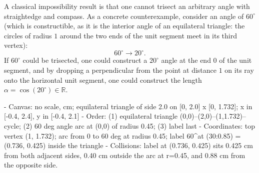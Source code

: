\begin{content}
A classical impossibility result is that one cannot trisect an arbitrary angle with straightedge and compass. As a concrete counterexample, consider an angle of $60^\circ$ (which is constructible, as it is the interior angle of an equilateral triangle: the circles of radius $1$ around the two ends of the unit segment meet in its third vertex):
\[
60^\circ \longrightarrow 20^\circ.
\]
If $60^\circ$ could be trisected, one could construct a $20^\circ$ angle at the end $0$ of the unit segment, and by dropping a perpendicular from the point at distance $1$ on its ray onto the horizontal unit segment, one could construct the length $\alpha = \cos(20^\circ) \in \mathbb{R}$.

\begin{hidden}
- Canvas: no scale, cm; equilateral triangle of side 2.0 on [0, 2.0] x [0, 1.732]; x in [-0.4, 2.4], y in [-0.4, 2.1]
- Order: (1) equilateral triangle (0,0)--(2,0)--(1,1.732)--cycle; (2) 60 deg angle arc at (0,0) of radius 0.45; (3) label last
- Coordinates: top vertex (1, 1.732); arc from 0 to 60 deg at radius 0.45; label 60^\circ at (30:0.85) = (0.736, 0.425) inside the triangle
- Collisions: label at (0.736, 0.425) sits 0.425 cm from both adjacent sides, 0.40 cm outside the arc at r=0.45, and 0.88 cm from the opposite side.
\end{hidden}
\begin{center}
\end{center}
\end{content}

